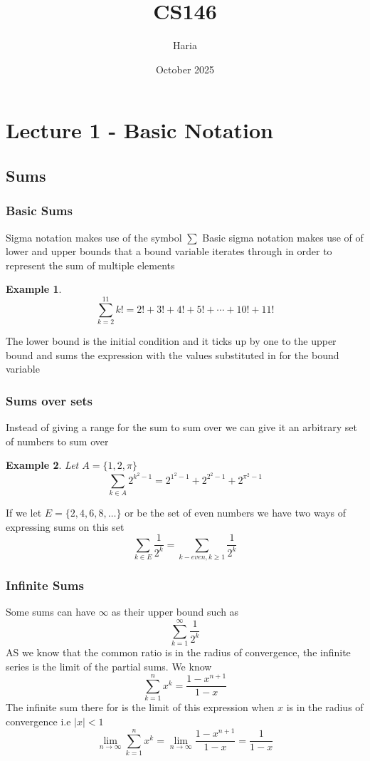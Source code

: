 \documentclass{article}
\title{CS146}
\author{Haria}
\date{October 2025}
\begin{document}
\maketitle

\section{Lecture 1 - Basic Notation}
\newtheorem{example}{Example}
\newtheorem{definition}{Definition}
\subsection{Sums}
\subsubsection{Basic Sums}
Sigma notation makes use of the symbol $\displaystyle \sum$
Basic sigma notation makes use of of lower and upper bounds that a bound variable iterates through in order to represent the sum of multiple elements
\begin{example}
    \[\sum_{k=2}^{11}k! = 2! + 3! + 4! + 5! + \cdots + 10 ! + 11!\]
\end{example}
The lower bound is the initial condition and it ticks up by one to the upper bound and sums the expression with the values substituted in for the bound variable
\subsubsection{Sums over sets}
Instead of giving a range for the sum to sum over we can give it an arbitrary set of numbers to sum over
\begin{example}
    Let $A = \{1,2,\pi\}$
    \[\sum_{k \in A}2^{k^{2} - 1 } = 2^{1^{2} - 1} + 2^{2^{2} - 1} + 2^{\pi^{2} - 1}\]
\end{example}
If we let $E= \{2,4,6,8,\dots\}$ or be the set of even numbers we have two ways of expressing sums on this set
\[\sum_{k \in E}\frac{1}{2^k} = \sum_{k-even,k \ge 1}\frac{1}{2^k}\]
\subsubsection{Infinite Sums}
Some sums can have $\infty$ as their upper bound such as 
\[\sum_{k = 1}^{\infty}\frac{1}{2^k}\]
AS we know that the common ratio is in the radius of convergence, the infinite series is the limit of the partial sums. We know
\[\sum_{k = 1}^{n}x^k = \frac{1 - x^{n+1}}{1-x}\]
The infinite sum there for is the limit of this expression when $x$ is in the radius of convergence i.e $|x| < 1$
\[\lim_{n \to \infty}\sum_{k = 1}^{n}x^k = \lim_{n \to \infty}\frac{1 - x^{n+1}}{1-x} = \frac{1}{1-x}\]
\end{document}
